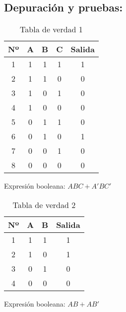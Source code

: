 \subsection{\textbf{Depuración y pruebas:}}

\begin{table}[h]
\centering
\begin{tabular}{|c|c|c|c|c|}
\hline
\textbf{Nº} & \textbf{A} & \textbf{B} & \textbf{C} & \textbf{Salida} \\
\hline
1 & 1 & 1 & 1 & 1 \\
2 & 1 & 1 & 0 & 0 \\
3 & 1 & 0 & 1 & 0 \\
4 & 1 & 0 & 0 & 0 \\
5 & 0 & 1 & 1 & 0 \\
6 & 0 & 1 & 0 & 1 \\
7 & 0 & 0 & 1 & 0 \\
8 & 0 & 0 & 0 & 0 \\
\hline
\end{tabular}
\caption{Tabla de verdad 1}
Expresión booleana: $ABC + A'BC'$
\end{table}

\begin{table}[h]
\centering
\begin{tabular}{|c|c|c|c|}
\hline
\textbf{Nº} & \textbf{A} & \textbf{B} & \textbf{Salida} \\
\hline
1 & 1 & 1 & 1 \\
2 & 1 & 0 & 1 \\
3 & 0 & 1 & 0 \\
4 & 0 & 0 & 0 \\
\hline
\end{tabular}
\caption{Tabla de verdad 2}
Expresión booleana: $AB + AB'$
\end{table}
